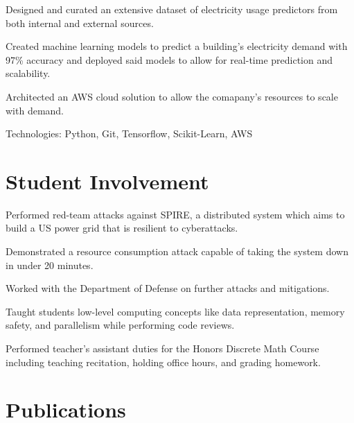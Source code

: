 \documentclass[]{deedy-resume-openfont}
\begin{document}
\begin{minipage}[t]{0.64\textwidth}
\begin{tightemize}
\item Designed and curated an extensive dataset of electricity usage predictors from
both internal and external sources.
\item Created machine learning models to predict a building's electricity demand with 97\% 
accuracy and deployed said models to allow for real-time prediction and scalability.
\item Architected an AWS cloud solution to allow the comapany's resources to scale with demand.
\item Technologies: Python, Git, Tensorflow, Scikit-Learn, AWS
\end{tightemize}
\sectionsep

\section{Student Involvement}
\descript{}
\begin{tightemize}
    \item Performed red-team attacks against SPIRE, a distributed system which aims to
    build a US power grid that is resilient to cyberattacks.
    \item Demonstrated a resource consumption attack capable of taking the system down 
    in under 20 minutes.
    \item Worked with the Department of Defense on further attacks and mitigations.
\end{tightemize}
\sectionsep

\descript{}
\begin{tightemize}
    \item Taught students low-level computing concepts like data representation, 
    memory safety, and parallelism while performing code reviews.
    \item Performed teacher's assistant duties for the Honors Discrete Math Course including 
    teaching recitation, holding office hours, and grading homework.
\end{tightemize}
\sectionsep



\section{Publications} 
\renewcommand\refname{\vskip -1.5em} %


\nocite{*}

\end{minipage} 
\end{document}
